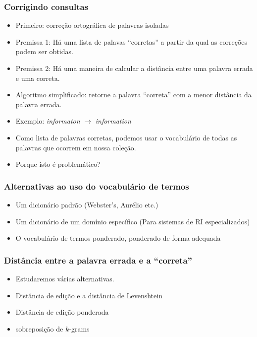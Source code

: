 \documentclass[compress]{beamer}
\begin{document}
\begin{frame}[<+->]
\frametitle{Corrigindo consultas}
\pause[2]
\begin{itemize}
\item Primeiro: correção ortográfica de palavras isoladas
\item Premissa 1: Há uma lista de palavas ``corretas'' a partir da qual as 
correções podem ser obtidas.
\item Premissa 2: Há uma maneira de calcular a {\color{blue} distância} entre 
uma palavra errada e uma correta.
\item Algoritmo simplificado: retorne a palavra ``correta'' com a menor 
distância da palavra errada.
\item Exemplo: \emph{informaton} $\rightarrow$ \emph{information}
\item Como lista de palavras corretas, podemos usar o vocabulário de todas as 
palavras que ocorrem em nossa coleção.
\item {\color{green} Porque isto é problemático?} 
\end{itemize}
\end{frame}

\begin{frame}[<+->]
\frametitle{Alternativas  ao uso do vocabulário de termos}
\pause[2]
\begin{itemize}
\item Um dicionário padrão (Webster's, Aurélio etc.)
\item Um dicionário de um domínio específico (Para sistemas de RI 
especializados)
\item O vocabulário de termos ponderado, ponderado de forma 
adequada
\end{itemize}
\end{frame}

\begin{frame}[<+->]
\frametitle{Distância entre a palavra errada e a ``correta''}
\pause[2]
\begin{itemize}
\item Estudaremos várias alternativas.
\item Distância de edição e a distância de Levenshtein 
\item Distância de edição ponderada
\item sobreposição de $k$-grams
\end{itemize}
\end{frame}
\end{document}
